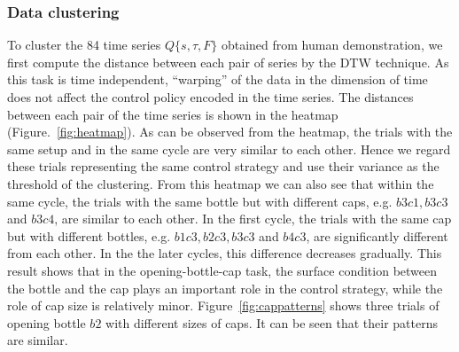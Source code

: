 \subsubsection{Data clustering}
To cluster the 84 time series $Q\{s,\tau,F\}$ obtained from human
demonstration, we first compute the distance between each pair of
series by the DTW technique. As this task is time independent,
``warping'' of the data in the dimension of time does not affect the
control policy encoded in the time series. The distances between each
pair of the time series is shown in the heatmap
(Figure.~\ref{fig:heatmap}). As can be observed from the heatmap, the
trials with the same setup and in the same cycle are very similar to
each other. Hence we regard these trials representing the same control
strategy and use their variance as the threshold of the
clustering. From this heatmap we can also see that within the same
cycle, the trials with the same bottle but with different caps,
e.g. $b3c1, b3c3$ and $b3c4$, are similar to each other. In the first
cycle, the trials with the same cap but with different bottles,
e.g. $b1c3, b2c3, b3c3$ and $b4c3$, are significantly different from
each other. In the the later cycles, this difference decreases
gradually. This result shows that in the opening-bottle-cap task, the
surface condition between the bottle and the cap plays an important
role in the control strategy, while the role of cap size is relatively
minor. Figure~\ref{fig:cappatterns} shows three trials of opening
bottle $b2$ with different sizes of caps. It can be seen that their
patterns are similar.

